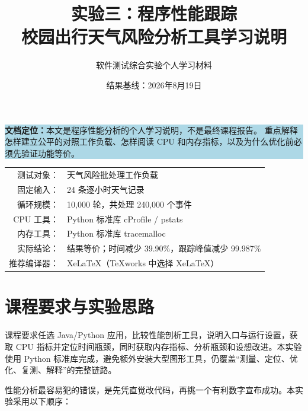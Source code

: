 \documentclass[UTF8,zihao=-4,a4paper]{ctexart}
\title{\heiti\Huge 实验三：程序性能跟踪\\[0.7em]
\Large 校园出行天气风险分析工具学习说明}
\author{软件测试综合实验\quad 个人学习材料}
\date{结果基线：2026年8月19日}
\begin{document}
\maketitle
\thispagestyle{empty}

\begin{center}
\begin{minipage}{0.88\textwidth}
\colorbox{LightBlue}{\parbox{0.94\textwidth}{
\textbf{文档定位：}本文是程序性能分析的个人学习说明，不是最终课程报告。
重点解释怎样建立公平的对照工作负载、怎样阅读 CPU 和内存指标，以及为什么优化前必须先验证功能等价。
}}
\end{minipage}
\end{center}

\vfill
\begin{center}
\begin{tabular}{rl}
测试对象：& 天气风险批处理工作负载 \\
固定输入：& 24 条逐小时天气记录 \\
循环规模：& 10,000 轮，共处理 240,000 个事件 \\
CPU 工具：& Python 标准库 cProfile / pstats \\
内存工具：& Python 标准库 tracemalloc \\
实际结论：& 结果等价；时间减少 39.90\%，跟踪峰值减少 99.987\% \\
推荐编译器：& XeLaTeX（TeXworks 中选择 XeLaTeX）
\end{tabular}
\end{center}

\clearpage
\tableofcontents
\clearpage

\section{课程要求与实验思路}

课程要求任选 Java/Python 应用，比较性能剖析工具，说明入口与运行设置，获取 CPU 指标并定位时间瓶颈，同时获取内存指标、分析瓶颈和设想改进。本实验使用 Python 标准库完成，避免额外安装大型图形工具，仍覆盖“测量、定位、优化、复测、解释”的完整链路。

性能分析最容易犯的错误，是先凭直觉改代码，再挑一个有利数字宣布成功。本实验采用以下顺序：

\begin{center}
\end{center}
\end{document}
